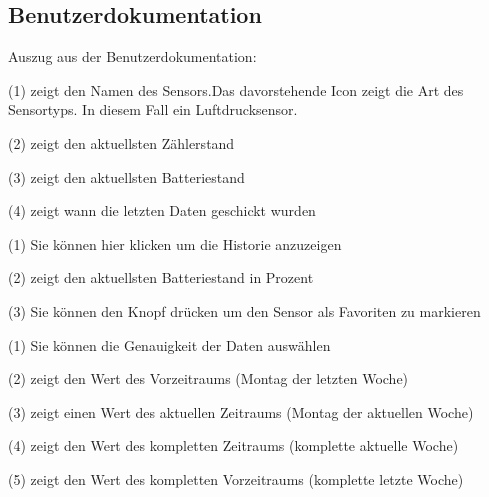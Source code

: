 \subsection{Benutzerdokumentation}
\label{app:BenutzerDoku}
Auszug aus der Benutzerdokumentation:

\begin{minipage}{0.5\textwidth}
\end{minipage}
\hfill
\begin{minipage}{0.5\textwidth}
    (1) zeigt den Namen des Sensors.Das davorstehende Icon zeigt die Art des Sensortyps. In diesem Fall ein Luftdrucksensor.

    (2) zeigt den aktuellsten Zählerstand

    (3) zeigt den aktuellsten Batteriestand

    (4) zeigt wann die letzten Daten geschickt wurden
\end{minipage}

\begin{minipage}{0.5\textwidth}
    (1) Sie können hier klicken um die Historie anzuzeigen

    (2) zeigt den aktuellsten Batteriestand in Prozent

    (3) Sie können den Knopf drücken um den Sensor als Favoriten zu markieren
\end{minipage}
\hfill
\begin{minipage}{0.5\textwidth}
    \hfill
\end{minipage}

\begin{minipage}{0.5\textwidth}
\end{minipage}
\hfill
\begin{minipage}{0.5\textwidth}
    (1) Sie können die Genauigkeit der Daten auswählen

    (2) zeigt den Wert des Vorzeitraums (Montag der letzten Woche)

    (3) zeigt einen Wert des aktuellen Zeitraums (Montag der aktuellen Woche)

    (4) zeigt den Wert des kompletten Zeitraums (komplette aktuelle Woche)

    (5) zeigt den Wert des kompletten Vorzeitraums (komplette letzte Woche)
\end{minipage}